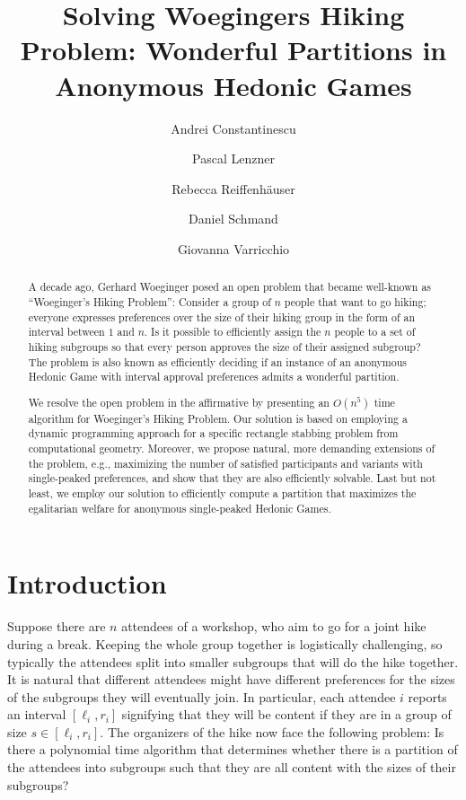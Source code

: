 \documentclass[a4paper]{article}
\title{Solving Woeginger\textquotesingle s Hiking Problem: Wonderful Partitions in Anonymous Hedonic Games}
\author{Andrei Constantinescu \and Pascal Lenzner \and Rebecca Reiffenhäuser \and Daniel Schmand \and Giovanna Varricchio}
\date{}
\begin{document}
\maketitle
\begin{abstract}
A decade ago, Gerhard Woeginger posed an open problem that became well-known as ``Woeginger's Hiking Problem'': Consider a group of $n$ people that want to go hiking; everyone expresses preferences over the size of their hiking group in the form of an interval between $1$ and $n$. Is it possible to efficiently assign the $n$ people to a set of hiking subgroups so that every person approves the size of their assigned subgroup? The problem is also known as efficiently deciding if an instance of an anonymous Hedonic Game with interval approval preferences admits a wonderful partition.

We resolve the open problem in the affirmative by presenting an $O(n^5)$ time algorithm for Woeginger's Hiking Problem. Our solution is based on employing a dynamic programming approach for a specific rectangle stabbing problem from computational geo\-metry. Moreover, we propose natural, more demanding extensions of the problem, e.g., maximizing the number of satisfied participants and variants with single-peaked preferences, and show that they are also efficiently solvable.
Last but not least, we employ our solution to efficiently compute a partition that maximizes the egalitarian welfare for anonymous single-peaked Hedonic Games.
\end{abstract}

\section{Introduction}
Suppose there are $n$ attendees of a workshop, who aim to go for a joint hike during a break. Keeping the whole group together is logistically challenging, so typically the attendees split into smaller subgroups that will do the hike together. 
It is natural that different attendees might have different preferences for the sizes of the subgroups they will eventually join. In particular, each attendee $i$ reports an interval $[\ell_i, r_i]$ signifying that they will be content if they are in a group of size $s \in [\ell_i, r_i]$. The organizers of the hike now face the following problem: Is there a polynomial time algorithm that determines whether there is a partition of the attendees into subgroups such that they are all content with the sizes of their subgroups?
\end{document}
